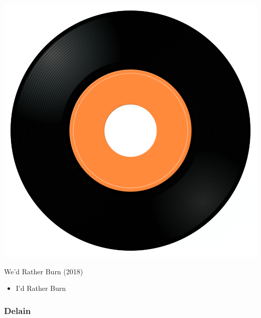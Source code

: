 \begin{minipage}[t]{0.25\textwidth}
\captionsetup{type=figure}
\includegraphics[width=\textwidth]{Images/cover.png}
\caption*{We'd Rather Burn (2018)}
\end{minipage}
\begin{minipage}[t]{0.25\textwidth}\vspace{0pt}
\begin{itemize}[nosep,leftmargin=1em,labelwidth=*,align=left]
	\setlength{\itemsep}{0pt}
	\item I'd Rather Burn
\end{itemize}
\end{minipage}

\subsubsection{Delain}

